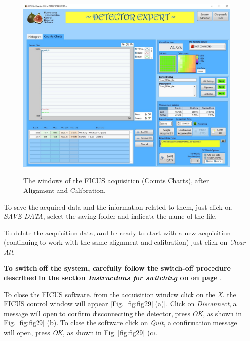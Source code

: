 \documentclass[a4paper,12pt,oneside,pdflatex,italian,final,twocolumn]{article}
\begin{document}
\begin{figure}[h]
\centering
{\includegraphics[width=.8\textwidth]{Capture44.jpg}} \quad
\caption{The windows of the FICUS acquisition (Counts Charts), after Alignment and Calibration.}\label{fig:fig26}
\end{figure}

To save the acquired data and the information related to them, just click on \textit{SAVE DATA}, select the saving folder and indicate the name of the file.

To delete the acquisition data, and be ready to start with a new acquisition (continuing to work with the same alignment and calibration) just click on \textit{Clear All}.

\textbf{To switch off the system, carefully follow the switch-off procedure described in the section \textit{Instructions for switching} on on page \pageref{spegnimento}}. 

To close the FICUS software, from the acquisition window click on the \textit{X}, the FICUS control window will appear [Fig. \ref{fig:fig29} (a)]. Click on \textit{Disconnect}, a message will open to confirm disconnecting the detector, press \textit{OK}, as shown in Fig. \ref{fig:fig29} (b). To close the software click on \textit{Quit}, a confirmation message will open, press \textit{OK}, as shown in Fig. \ref{fig:fig29} (c).
\end{document}

